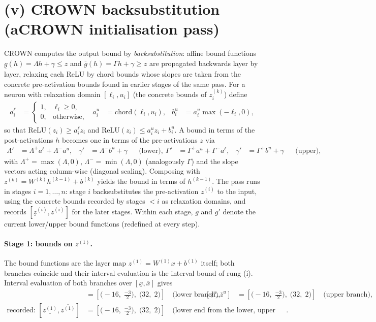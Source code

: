 \documentclass[11pt]{article}
\begin{document}
\section{(v) CROWN backsubstitution (aCROWN initialisation pass)}
CROWN computes the output bound by \emph{backsubstitution}: affine bound functions
$\underline{g}(h) = \Lambda h + \gamma \le z$ and $\overline{g}(h) = \Gamma h + \gamma \ge z$
are propagated backwards layer by layer, relaxing each ReLU by chord bounds whose slopes are taken
from the concrete pre-activation bounds found in earlier stages of the same pass. For a neuron with
relaxation domain $[\ell_i, u_i]$ (the concrete bounds of $z^{(k)}_i$) define
\begin{align*}
a^{\ell}_i &= \begin{cases} 1, & \ell_i \ge 0,\\ 0, & \text{otherwise}, \end{cases} & a^{u}_i &= \mathrm{chord}(\ell_i, u_i), & b^{u}_i &= a^{u}_i \max(-\ell_i, 0),
\end{align*}
so that $\mathrm{ReLU}(z_i) \ge a^{\ell}_i z_i$ and
$\mathrm{ReLU}(z_i) \le a^{u}_i z_i + b^{u}_i$. A bound in terms of the post-activations $h$ becomes
one in terms of the pre-activations $z$ via
\begin{align*}
\Lambda' &= \Lambda^{+} a^{\ell} + \Lambda^{-} a^{u}, & \gamma' &= \Lambda^{-} b^{u} + \gamma && \text{(lower)}, \
\Gamma' &= \Gamma^{+} a^{u} + \Gamma^{-} a^{\ell}, & \gamma' &= \Gamma^{+} b^{u} + \gamma && \text{(upper)},
\end{align*}
with $\Lambda^{+} = \max(\Lambda, 0)$, $\Lambda^{-} = \min(\Lambda, 0)$ (analogously $\Gamma$) and the
slope vectors acting column-wise (diagonal scaling). Composing with
$z^{(k)} = W^{(k)} h^{(k-1)} + b^{(k)}$ yields the bound in terms of $h^{(k-1)}$. The pass runs in
stages $i = 1, \dots, n$: stage $i$ backsubstitutes the pre-activation $z^{(i)}$ to the input, using
the concrete bounds recorded by stages $< i$ as relaxation domains, and records
$[\underline{z}^{(i)}, \overline{z}^{(i)}]$ for the later stages. Within each stage, $g$ and $g'$
denote the current lower/upper bound functions (redefined at every step).
\paragraph{Stage 1: bounds on $z^{(1)}$.}
The bound functions are the layer map $z^{(1)} = W^{(1)} x + b^{(1)}$ itself; both branches coincide and their interval evaluation is the interval bound of rung (i).
Interval evaluation of both branches over $[\underline{x}, \overline{x}]$ gives
\begin{align*}
[\underline{z}^{\ell}, \overline{z}^{\ell}] &= [\bigl(-16,\; \frac{-3}{2}\bigr),\; \bigl(32,\; 2\bigr)] \quad\text{(lower branch)}, & [\underline{z}^{u}, \overline{z}^{u}] &= [\bigl(-16,\; \frac{-3}{2}\bigr),\; \bigl(32,\; 2\bigr)] \quad\text{(upper branch)}, \\
\text{recorded: } [\underline{z^{(1)}}, \overline{z^{(1)}}] &= [\bigl(-16,\; \frac{-3}{2}\bigr),\; \bigl(32,\; 2\bigr)] \quad\text{(lower end from the lower, upper end from the upper branch)}.
\end{align*}
\end{document}
